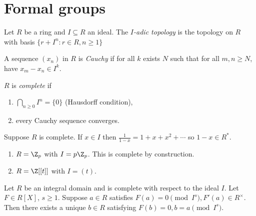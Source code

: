 \documentclass[a4paper]{article}
\theoremstyle{definition}
\begin{document}
\section{Formal groups}

\begin{definition}
  Let \(R\) be a ring and \(I \subseteq R\) an ideal. The \emph{\(I\)-adic topology} is the topology on \(R\) with basis \(\{r + I^n: r \in R, n \geq 1\}\)
\end{definition}

\begin{definition}
  A sequence \((x_n)\) in \(R\) is \emph{Cauchy} if for all \(k\) exists \(N\) such that for all \(m, n \geq N\), have \(x_m - x_n \in I^k\).
\end{definition}

\begin{definition}
  \(R\) is \emph{complete} if
  \begin{enumerate}
  \item \(\bigcap_{n \geq 0} I^n = \{0\}\) (Hausdorff condition),
  \item every Cauchy sequence converges.
  \end{enumerate}
\end{definition}

\begin{remark}
  Suppose \(R\) is complete. If \(x \in I\) then \(\frac{1}{1 - x} = 1 + x + x^2 + \cdots\) so \(1 - x \in R^*\).
\end{remark}

\begin{eg}\leavevmode
  \begin{enumerate}
  \item \(R = \Z_p\) with \(I = p\Z_p\). This is complete by construction.
  \item \(R = \Z[[t]]\) with \(I = (t)\).
  \end{enumerate}
\end{eg}

\begin{lemma}
  Let \(R\) be an integral domain and is complete with respect to the ideal \(I\). Let \(F \in R[X]\), \(s \geq 1\). Suppose \(a \in R\) satisfies \(F(a) = 0 \pmod{I^s}, F'(a) \in R^\times\). Then there exists a unique \(b \in R\) satisfying \(F(b) = 0, b = a \pmod{I^s}\).
\end{lemma}
\end{document}
